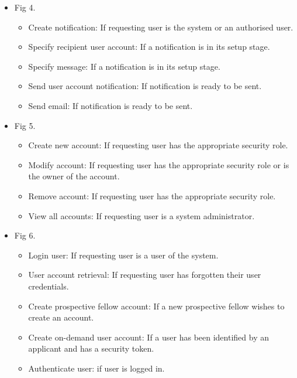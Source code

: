 \documentclass[12pt]{article}
\begin{document}
\begin{itemize}
	\item Fig 4.
		\begin{itemize}
			\item Create notification: If requesting user is the system or an authorised user.
			\item Specify recipient user account: If a notification is in its setup stage.				
			\item Specify message: If a notification is in its setup stage.
			\item Send user account notification: If notification is ready to be sent.
			\item Send email: If notification is ready to be sent.	
		\end{itemize}
	
	\item Fig 5.
		\begin{itemize}
			\item Create new account: If requesting user has the appropriate security role.
			\item Modify account: If requesting user has the appropriate security role or is the owner of the account.				
			\item Remove account: If requesting user has the appropriate security role.	
			\item View all accounts: If requesting user is a system administrator.					
		\end{itemize}
	
	\item Fig 6.
		\begin{itemize}
			\item Login user: If requesting user is a user of the system.
			\item User account retrieval: If requesting user has forgotten their user credentials.				
			\item Create prospective fellow account: If a new prospective fellow wishes to create an account.	
			\item Create on-demand user account: If a user has been identified by an applicant and has a security token.
			\item Authenticate user: if user is logged in.						
		\end{itemize}
	

\end{itemize}
\end{document}
